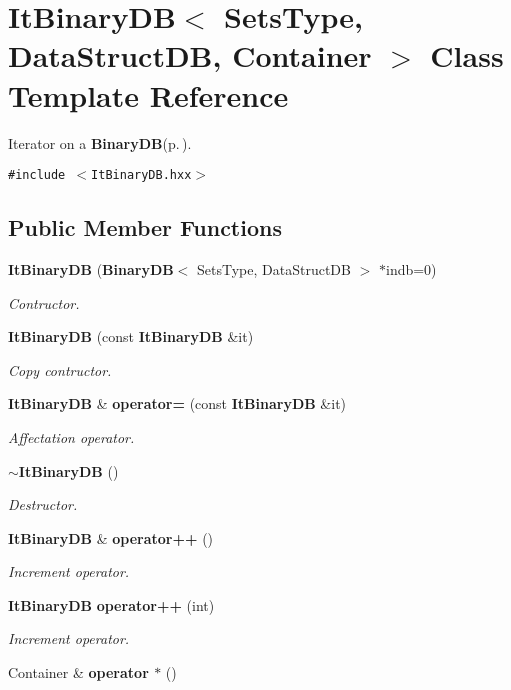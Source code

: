 \section{It\-Binary\-DB$<$ Sets\-Type, Data\-Struct\-DB, Container $>$ Class Template Reference}
\label{class_it_binary_d_b}
Iterator on a {\bf Binary\-DB}{\rm (p.\,\pageref{class_binary_d_b})}.  


{\tt \#include $<$It\-Binary\-DB.hxx$>$}

\subsection*{Public Member Functions}
\begin{CompactItemize}
\item 
{\bf It\-Binary\-DB} ({\bf Binary\-DB}$<$ Sets\-Type, Data\-Struct\-DB $>$ $\ast$indb=0)
\begin{CompactList}\small\item\em Contructor. \item\end{CompactList}\item 
{\bf It\-Binary\-DB} (const {\bf It\-Binary\-DB} \&it)\label{class_it_binary_d_b_61f089507fe6f0a87faf85b1998f2be7}

\begin{CompactList}\small\item\em Copy contructor. \item\end{CompactList}\item 
{\bf It\-Binary\-DB} \& {\bf operator=} (const {\bf It\-Binary\-DB} \&it)\label{class_it_binary_d_b_1e9d36966f7fb7419e1902664eace7c9}

\begin{CompactList}\small\item\em Affectation operator. \item\end{CompactList}\item 
{\bf $\sim$It\-Binary\-DB} ()\label{class_it_binary_d_b_cad2c6eb1c50686997e3b2946f082243}

\begin{CompactList}\small\item\em Destructor. \item\end{CompactList}\item 
{\bf It\-Binary\-DB} \& {\bf operator++} ()
\begin{CompactList}\small\item\em Increment operator. \item\end{CompactList}\item 
{\bf It\-Binary\-DB} {\bf operator++} (int)
\begin{CompactList}\small\item\em Increment operator. \item\end{CompactList}\item 
Container \& {\bf operator $\ast$} ()\label{class_it_binary_d_b_c117c52f125ee39ef6031829ad79f79b}


\end{CompactItemize}
